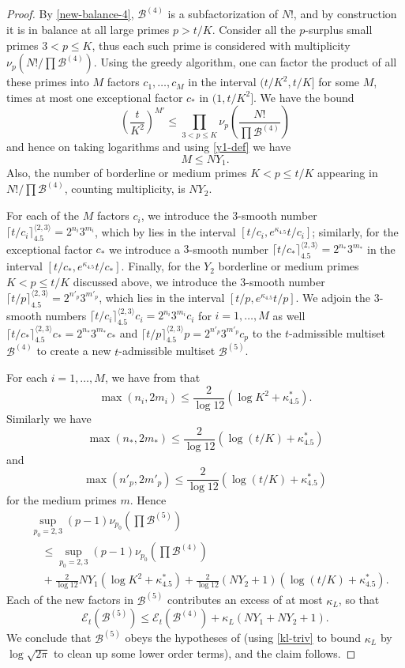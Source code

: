 \documentclass[12pt,a4paper,reqno]{amsart}
\numberwithin{equation}{section}
\theoremstyle{plain}
\theoremstyle{definition}
\newcommand\tuple{{\mathcal B}}
\newcommand\excess{{\mathcal{E}}}
\begin{document}
\begin{proof} By \eqref{new-balance-4}, $\tuple^{(4)}$ is a subfactorization of $N!$, and by construction it is in balance at all large primes $p>t/K$. Consider all the $p$-surplus small primes $3 < p \leq K$, thus each such prime is considered with multiplicity $\nu_p(N!/\prod \tuple^{(4)})$.  
Using the greedy algorithm, one can factor the product of all these primes into $M$ factors $c_1,\dots,c_M$ in the interval $(t/K^2, t/K]$ for some $M$, times at most one exceptional factor $c_*$ in $(1,t/K^2]$.  We have the bound
$$ \left(\frac{t}{K^2}\right)^{M'} \leq
\prod_{3 < p \leq K} \nu_p\left(\frac{N!}{\prod \tuple^{(4)}}\right)$$
and hence on taking logarithms and using \eqref{y1-def} we have
$$
M \leq NY_1. 
$$
Also, the number of borderline or medium primes $K < p \leq t/K$ appearing in $N!/\prod \tuple^{(4)}$, counting multiplicity, is $NY_2$.

For each of the $M$ factors $c_i$, we introduce the $3$-smooth number $\lceil t/c_i\rceil^{\langle 2,3\rangle}_{4.5} = 2^{n_i} 3^{m_i}$, which by  lies in the interval $[t/c_i,e^{\kappa_{4.5}} t/c_i]$; similarly, for the exceptional factor $c_*$ we introduce a $3$-smooth number $\lceil t/c_* \rceil^{\langle 2,3 \rangle}_{4.5} = 2^{n_*} 3^{m_*}$ in the interval $[t/c_*,e^{\kappa_{4.5}} t/c_*]$.  Finally, for the $Y_2$ borderline or medium primes $K < p \leq t/K$ discussed above, we introduce the $3$-smooth number $\lceil t/p\rceil^{\langle 2,3\rangle}_{4.5} = 2^{n'_p} 3^{m'_p}$, which lies in the interval $[t/p,e^{\kappa_{4.5}} t/p]$.  We adjoin the $3$-smooth numbers $\lceil t/c_i\rceil^{\langle 2,3\rangle}_{4.5} c_i = 2^{n_i} 3^{m_i} c_i$ for $i=1,\dots,M$ as well $\lceil t/c_*\rceil^{\langle 2,3\rangle}_{4.5} c_* = 2^{n_*} 3^{m_*} c_*$ and $\lceil t/p \rceil^{\langle 2,3\rangle}_{4.5} p = 2^{n'_p} 3^{m'_p} c_p$ to the $t$-admissible multiset $\tuple^{(4)}$ to create a new $t$-admissible multiset $\tuple^{(5)}$.  

For each $i=1,\dots,M$, we have from  that
$$ \max( n_i, 2m_i ) \leq \frac{2}{\log 12} (\log K^2 + \kappa^*_{4.5}).$$
Similarly we have
$$ \max( n_*, 2m_* ) \leq \frac{2}{\log 12} (\log (t/K) + \kappa^*_{4.5})$$
and
$$ \max( n'_p, 2m'_p ) \leq \frac{2}{\log 12} (\log (t/K) + \kappa^*_{4.5})$$
for the medium primes $m$.
Hence
\begin{align*} 
  & \sup_{p_0=2,3} (p-1) \nu_{p_0}\left(\prod \tuple^{(5)}\right) \\
  &\quad \leq \sup_{p_0=2,3} (p-1) \nu_{p_0}\left(\prod \tuple^{(4)}\right)  \\
  &\quad + \frac{2}{\log 12} NY_1 (\log K^2 + \kappa^*_{4.5}) + \frac{2}{\log 12} (NY_2+1) (\log(t/K) + \kappa^*_{4.5}).
\end{align*}
Each of the new factors in $\tuple^{(5)}$ contributes an excess of at most $\kappa_L$, so that
$$ \excess_t(\tuple^{(5)})  \leq \excess_t(\tuple^{(4)}) + \kappa_L (NY_1+NY_2+1).$$
We conclude that $\tuple^{(5)}$ obeys the hypotheses of  (using \eqref{kl-triv} to bound $\kappa_L$ by $\log\sqrt{2\pi}$ to clean up some lower order terms), and the claim follows.
\end{proof}
\end{document}
